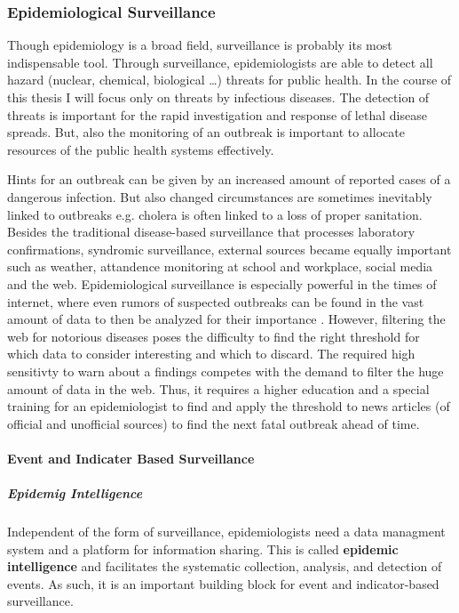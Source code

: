 \subsubsection{Epidemiological Surveillance}

Though epidemiology is a broad field, surveillance is probably its most indispensable tool. Through surveillance,
epidemiologists are able to detect all hazard (nuclear, chemical, biological \ldots) threats for public health. In the course of this thesis I will focus only on threats by infectious diseases. The detection of threats is important for the rapid investigation and response of lethal disease spreads. But, also the monitoring of an outbreak is important to allocate resources of the public health systems effectively\cite{EarlyDetection}.

Hints for an outbreak can be given by an increased amount of reported cases of a dangerous infection. But also changed circumstances are sometimes inevitably linked to outbreaks e.g. cholera is often linked to a loss of proper sanitation. Besides the traditional disease-based surveillance that processes laboratory confirmations, syndromic surveillance, external sources became equally important such as weather, attandence monitoring at school and workplace, social media and the web\cite{EarlyDetection}. Epidemiological surveillance is especially powerful in the times of internet, where even rumors of suspected outbreaks can be found in the vast amount of data to then be analyzed for their importance \cite{EpiSurv}. However, filtering the web for notorious diseases poses the difficulty to find the right threshold for which data to consider interesting and which to discard. The required high sensitivty to warn about a findings competes with the demand to filter the huge amount of data in the web. Thus, it requires a higher education and a special training for an epidemiologist to find and apply the threshold to news articles (of official and unofficial sources) to find the next fatal outbreak ahead of time.



\paragraph{Event and Indicater Based Surveillance}

\subparagraph{Epidemig Intelligence}
Independent of the form of surveillance, epidemiologists need a data managment system and a platform for information sharing. This is called \textbf{epidemic intelligence} and facilitates the systematic collection, analysis, and detection of events\cite{EarlyDetection}. As such, it is an important building block for event and indicator-based surveillance.

